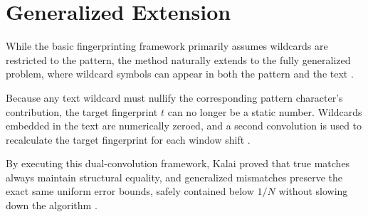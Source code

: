 \section{Generalized Extension}
While the basic fingerprinting framework primarily assumes wildcards are restricted to the pattern, the method naturally extends to the fully generalized problem, where wildcard symbols can appear in both the pattern and the text \cite{kalai2002}.

Because any text wildcard must nullify the corresponding pattern character's contribution, the target fingerprint $t$ can no longer be a static number. Wildcards embedded in the text are numerically zeroed, and a second convolution is used to recalculate the target fingerprint for each window shift \cite{kalai2002}. 

By executing this dual-convolution framework, Kalai proved that true matches always maintain structural equality, and generalized mismatches preserve the exact same uniform error bounds, safely contained below $1/N$ without slowing down the algorithm \cite{kalai2002}.